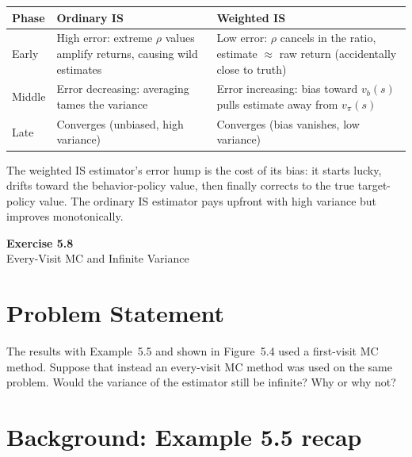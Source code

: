 \documentclass[11pt]{article}
\begin{document}
\begin{table}[ht]
    \centering
    \begin{tabular}{p{} p{} p{}}
        \toprule
        \textbf{Phase} & \textbf{Ordinary IS} & \textbf{Weighted IS} \\
        \midrule
        Early & High error: extreme $\rho$ values amplify returns, causing wild estimates & Low error: $\rho$ cancels in the ratio, estimate $\approx$ raw return (accidentally close to truth) \\
        \addlinespace
        Middle & Error decreasing: averaging tames the variance & Error increasing: bias toward $v_b(s)$ pulls estimate away from $v_\pi(s)$ \\
        \addlinespace
        Late & Converges (unbiased, high variance) & Converges (bias vanishes, low variance) \\
        \bottomrule
    \end{tabular}
\end{table}

The weighted IS estimator's error hump is the cost of its bias: it starts lucky, drifts toward the behavior-policy value, then finally corrects to the true target-policy value. The ordinary IS estimator pays upfront with high variance but improves monotonically.

\newpage

\begin{center}
    {\Large\color{garnet}\textbf{Exercise 5.8}}\\[6pt]
    {\large Every-Visit MC and Infinite Variance}
\end{center}

\section*{Problem Statement}

The results with Example~5.5 and shown in Figure~5.4 used a first-visit MC method. Suppose that instead an every-visit MC method was used on the same problem. Would the variance of the estimator still be infinite? Why or why not?

\section*{Background: Example 5.5 recap}
\end{document}
